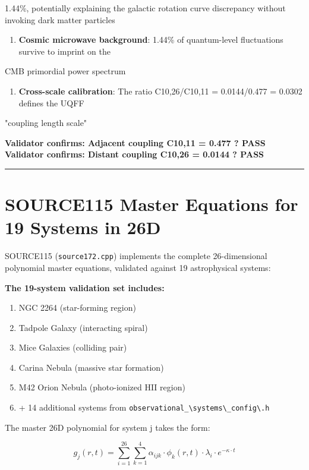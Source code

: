 \documentclass[12pt,a4paper]{article}
\begin{document}
1.44\%, potentially explaining the galactic rotation curve discrepancy without invoking dark matter particles

\begin{enumerate}
  \item \textbf{Cosmic microwave background}: 1.44\% of quantum-level fluctuations survive to imprint on the
\end{enumerate}

CMB primordial power spectrum

\begin{enumerate}
  \item \textbf{Cross-scale calibration}: The ratio C10,26/C10,11 = 0.0144/0.477 = 0.0302 defines the UQFF
\end{enumerate}

"coupling length scale"

\textbf{Validator confirms: Adjacent coupling C10,11 = 0.477 ? PASS} \textbf{Validator confirms: Distant coupling C10,26 = 0.0144 ? PASS}

\medskip\hrule\medskip

\section{SOURCE115  Master Equations for 19 Systems in 26D}

SOURCE115 (\texttt{source172.cpp}) implements the complete 26-dimensional polynomial master equations, validated against 19 astrophysical systems:

\textbf{The 19-system validation set includes:}

\begin{enumerate}
  \item NGC 2264 (star-forming region)
  \item Tadpole Galaxy (interacting spiral)
  \item Mice Galaxies (colliding pair)
  \item Carina Nebula (massive star formation)
  \item M42 Orion Nebula (photo-ionized HII region)
  \item + 14 additional systems from \texttt{observational\_\textbackslash {systems\textbackslash \_config\textbackslash }.h}
\end{enumerate}

The master 26D polynomial for system j takes the form:

\begin{equation}
g_j(r,t) = \sum_{i=1}^{26} \sum_{k=1}^{4} \alpha_{ijk} \cdot \phi_k(r,t) \cdot \lambda_i \cdot e^{-\kappa \cdot t}
\end{equation}
\end{document}
